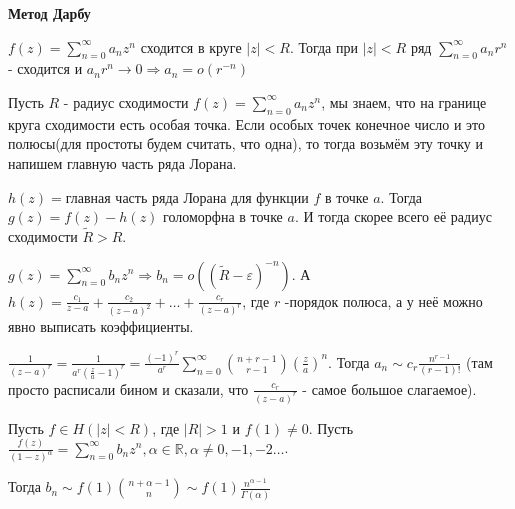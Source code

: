\begin{example}
    \textbf{Метод Дарбу}

    $f(z) = \sum_{n = 0}^{\infty} a_nz^n$ сходится в круге $|z| < R$. Тогда при
    $|z| < R$ ряд $\sum_{n = 0}^{\infty} a_nr^n$ - сходится и $a_nr^n \rightarrow 0 \Rightarrow a_n = o(r^{-n})$
    
    Пусть $R$ - радиус сходимости $f(z) = \sum_{n = 0}^{\infty} a_nz^n$, мы знаем, что на границе круга сходимости есть особая точка.
    Если особых точек конечное число и это полюсы(для простоты будем считать, что одна), то тогда возьмём эту точку и напишем главную часть ряда Лорана.

    $h(z) = \text{главная часть ряда Лорана для функции $f$ в точке $a$}$. Тогда $g(z) = f(z) - h(z)$ голоморфна в точке $a$. И тогда скорее всего
    её радиус сходимости $\tilde{R} > R$.

    $g(z) = \sum_{n = 0}^{\infty} b_nz^n \Rightarrow b_n =  o((\tilde{R} - \varepsilon)^{-n})$. А $h(z) = 
    \frac{c_1}{z - a} + \frac{c_2}{(z - a)^2} + \ldots + \frac{c_r}{(z - a)^r}$, где $r$ -порядок полюса, а у неё можно явно выписать коэффициенты.

    $\frac{1}{(z - a)^r} = \frac{1}{a^r(\frac{z}{a} - 1)^r} = \frac{(-1)^r}{a^r} \sum_{n = 0}^{\infty} \binom{n+r-1}{r-1} \left ( \frac{z}{a} \right )^n$. Тогда 
    $a_n \sim c_r \frac{n^{r - 1}}{(r - 1)!}$ (там просто расписали бином и сказали, что $\frac{c_r}{(z - a)^r}$ - самое большое слагаемое).
\end{example}

\begin{theorem}
    Пусть $f \in H(|z| < R)$, где $|R| > 1$ и $f(1) \neq 0$. Пусть $\frac{f(z)}{(1 - z)^\alpha} = \sum_{n = 0}^{\infty} b_n z^n, \alpha \in \mathbb{R}, \alpha \neq 0, -1, -2 \ldots$.

    Тогда $b_n \sim f(1) \binom{n + \alpha - 1}{n} \sim f(1) \frac{n^{\alpha - 1}}{\Gamma (\alpha)}$
\end{theorem}


